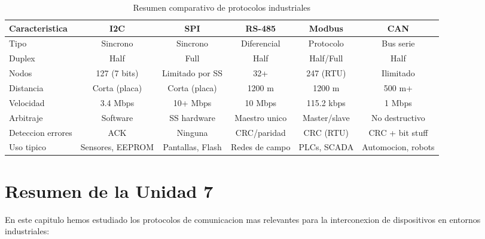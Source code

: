 \begin{table}[H]
    \centering
    \caption{Resumen comparativo de protocolos industriales}
    \label{tab:resumen_protocolos}
    \small
    \begin{tabular}{|l|c|c|c|c|c|}
        \hline
        \textbf{Caracteristica} & \textbf{I2C} & \textbf{SPI} & \textbf{RS-485} & \textbf{Modbus} & \textbf{CAN} \\
        \hline
        Tipo & Sincrono & Sincrono & Diferencial & Protocolo & Bus serie \\
        \hline
        Duplex & Half & Full & Half & Half/Full & Half \\
        \hline
        Nodos & 127 (7 bits) & Limitado por SS & 32+ & 247 (RTU) & Ilimitado \\
        \hline
        Distancia & Corta (placa) & Corta (placa) & 1200 m & 1200 m & 500 m+ \\
        \hline
        Velocidad & 3.4 Mbps & 10+ Mbps & 10 Mbps & 115.2 kbps & 1 Mbps \\
        \hline
        Arbitraje & Software & SS hardware & Maestro unico & Master/slave & No destructivo \\
        \hline
        Deteccion errores & ACK & Ninguna & CRC/paridad & CRC (RTU) & CRC + bit stuff \\
        \hline
        Uso tipico & Sensores, EEPROM & Pantallas, Flash & Redes de campo & PLCs, SCADA & Automocion, robots \\
        \hline
    \end{tabular}
\end{table}


\section{Resumen de la Unidad 7}

En este capitulo hemos estudiado los protocolos de comunicacion mas
relevantes para la interconexion de dispositivos en entornos industriales:

